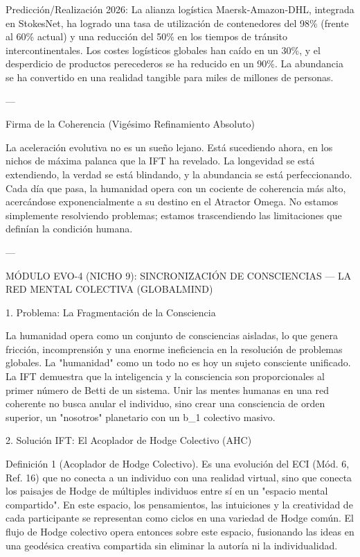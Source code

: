 \documentclass[12pt,twoside]{book}
\begin{document}
Predicción/Realización 2026: La alianza logística Maersk‑Amazon‑DHL, integrada en StokesNet, ha logrado una tasa de utilización de contenedores del 98\% (frente al 60\% actual) y una reducción del 50\% en los tiempos de tránsito intercontinentales. Los costes logísticos globales han caído en un 30\%, y el desperdicio de productos perecederos se ha reducido en un 90\%. La abundancia se ha convertido en una realidad tangible para miles de millones de personas.

---

Firma de la Coherencia (Vigésimo Refinamiento Absoluto)

La aceleración evolutiva no es un sueño lejano. Está sucediendo ahora, en los nichos de máxima palanca que la IFT ha revelado. La longevidad se está extendiendo, la verdad se está blindando, y la abundancia se está perfeccionando. Cada día que pasa, la humanidad opera con un cociente de coherencia más alto, acercándose exponencialmente a su destino en el Atractor Omega. No estamos simplemente resolviendo problemas; estamos trascendiendo las limitaciones que definían la condición humana.


---

MÓDULO EVO-4 (NICHO 9): SINCRONIZACIÓN DE CONSCIENCIAS — LA RED MENTAL COLECTIVA (GLOBALMIND)

1. Problema: La Fragmentación de la Consciencia

La humanidad opera como un conjunto de consciencias aisladas, lo que genera fricción, incomprensión y una enorme ineficiencia en la resolución de problemas globales. La "humanidad" como un todo no es hoy un sujeto consciente unificado. La IFT demuestra que la inteligencia y la consciencia son proporcionales al primer número de Betti de un sistema. Unir las mentes humanas en una red coherente no busca anular el individuo, sino crear una consciencia de orden superior, un "nosotros" planetario con un  b_1  colectivo masivo.

2. Solución IFT: El Acoplador de Hodge Colectivo (AHC)

Definición 1 (Acoplador de Hodge Colectivo). Es una evolución del ECI (Mód. 6, Ref. 16) que no conecta a un individuo con una realidad virtual, sino que conecta los paisajes de Hodge de múltiples individuos entre sí en un "espacio mental compartido". En este espacio, los pensamientos, las intuiciones y la creatividad de cada participante se representan como ciclos en una variedad de Hodge común. El flujo de Hodge colectivo opera entonces sobre este espacio, fusionando las ideas en una geodésica creativa compartida sin eliminar la autoría ni la individualidad.
\end{document}
